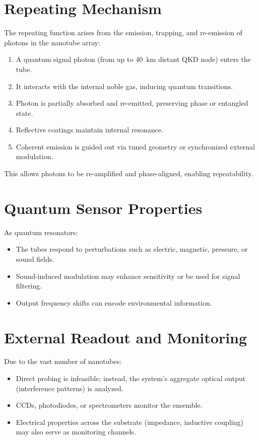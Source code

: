 \documentclass[11pt]{article}
\begin{document}
	\section{Repeating Mechanism}
	The repeating function arises from the emission, trapping, and re-emission of photons in the nanotube array:
	\begin{enumerate}
		\item A quantum signal photon (from up to \SI{40}{\kilo\meter} distant QKD node) enters the tube.
		\item It interacts with the internal noble gas, inducing quantum transitions.
		\item Photon is partially absorbed and re-emitted, preserving phase or entangled state.
		\item Reflective coatings maintain internal resonance.
		\item Coherent emission is guided out via tuned geometry or synchronized external modulation.
	\end{enumerate}
	This allows photons to be re-amplified and phase-aligned, enabling repeatability.
	
	\section{Quantum Sensor Properties}
	As quantum resonators:
	\begin{itemize}
		\item The tubes respond to perturbations such as electric, magnetic, pressure, or sound fields.
		\item Sound-induced modulation may enhance sensitivity or be used for signal filtering.
		\item Output frequency shifts can encode environmental information.
	\end{itemize}
	
	\section{External Readout and Monitoring}
	Due to the vast number of nanotubes:
	\begin{itemize}
		\item Direct probing is infeasible; instead, the system's aggregate optical output (interference patterns) is analyzed.
		\item CCDs, photodiodes, or spectrometers monitor the ensemble.
		\item Electrical properties across the substrate (impedance, inductive coupling) may also serve as monitoring channels.
	\end{itemize}
	
\end{document}
